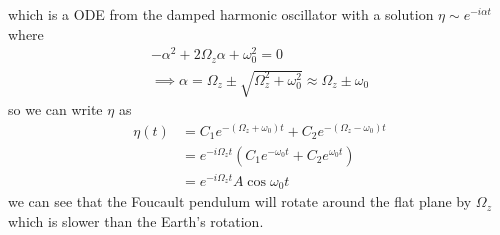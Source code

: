 \documentclass[../main.tex]{subfiles}
\begin{document}
which is a ODE from the damped harmonic oscillator with a solution $\eta \sim e^{-i\alpha t}$ where
\begin{align*}
    -\alpha^2 + 2\Omega_z \alpha + \omega_0^2 = 0 \\
    \implies \alpha = \Omega_z \pm \sqrt{\Omega_z^2 + \omega_0^2} \approx \Omega_z \pm \omega_0
\end{align*}
so we can write $\eta$ as
\begin{align*}
    \eta(t) &= C_1 e^{-(\Omega_z + \omega_0)t} + C_2 e^{-(\Omega_z - \omega_0)t} \\
    &= e^{-i\Omega_z t} (C_1 e^{-\omega_0 t} + C_2 e^{\omega_0 t}) \\
    &= e^{-i\Omega_z t} A \cos{\omega_0 t}
\end{align*}
we can see that the Foucault pendulum will rotate around the flat plane by $\Omega_z$ which is
slower than the Earth's rotation.
\end{document}
